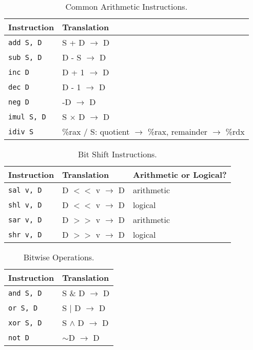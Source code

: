 \documentclass{article}
\begin{document}
\begin{table}[p]
\centering
\begin{tabularx}{\textwidth}{XX}
\hline
\textbf{Instruction} & \textbf{Translation} \\
\hline
\texttt{add S, D} & S + D $\rightarrow$ D \\
\texttt{sub S, D} & D - S $\rightarrow$ D \\
\texttt{inc D}    & D + 1 $\rightarrow$ D \\
\texttt{dec D}    & D - 1 $\rightarrow$ D \\
\texttt{neg D}    & -D $\rightarrow$ D \\
\texttt{imul S, D}& S $\times$ D $\rightarrow$ D \\
\texttt{idiv S}   & \%rax / S: quotient $\rightarrow$ \%rax, remainder $\rightarrow$ \%rdx \\
\hline
\end{tabularx}
\caption{Common Arithmetic Instructions.}
\label{table:common-arithmetic-instructions}
\end{table}

\begin{table}[p]
\centering
\begin{tabularx}{\textwidth}{XXX}
\hline
\textbf{Instruction} & \textbf{Translation} & \textbf{Arithmetic or Logical?} \\
\hline
\texttt{sal v, D} & D $<<$ v $\rightarrow$ D & arithmetic \\
\texttt{shl v, D} & D $<<$ v $\rightarrow$ D & logical \\
\texttt{sar v, D} & D $>>$ v $\rightarrow$ D & arithmetic \\
\texttt{shr v, D} & D $>>$ v $\rightarrow$ D & logical \\
\hline
\end{tabularx}
\caption{Bit Shift Instructions.}
\label{table:bit-shift-instructions}
\end{table}

\begin{table}[p]
\centering
\begin{tabularx}{\textwidth}{XX}
\hline
\textbf{Instruction} & \textbf{Translation} \\
\hline
\texttt{and S, D} & S \& D $\rightarrow$ D \\
\texttt{or S, D}  & S $|$ D $\rightarrow$ D \\
\texttt{xor S, D} & S $\wedge$ D $\rightarrow$ D \\
\texttt{not D}    & $\sim$D $\rightarrow$ D \\
\hline
\end{tabularx}
\caption{Bitwise Operations.}
\label{table:bitwise-operations}
\end{table}
\end{document}

